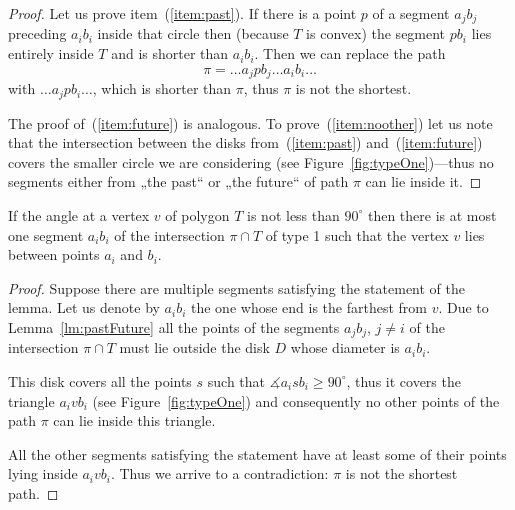 \documentclass[a4paper,11pt]{article}
\begin{document}
\begin{proof}

	Let us prove item~(\ref{item:past}). If there is a point $p$ of a segment $a_jb_j$ preceding $a_ib_i$ inside that circle then (because $T$ is convex) the segment $pb_i$ lies entirely inside $T$ and is shorter than $a_ib_i$. Then we can replace the path
	$$\pi = \ldots a_jpb_j \ldots a_ib_i \ldots$$
with $\ldots a_jpb_i \ldots$, which is shorter than $\pi$, thus $\pi$ is not the shortest.

	The proof of~(\ref{item:future}) is analogous. To prove~(\ref{item:noother}) let us note that the intersection between the disks from~(\ref{item:past}) and~(\ref{item:future}) covers the smaller circle we are considering (see Figure~\ref{fig:typeOne})—thus no segments either from „the past“ or „the future“ of path $\pi$ can lie inside it.

\end{proof}

\begin{figure}[h]
	
\end{figure}

\begin{lemma}
\label{lm:typeOne}
	If the angle at a vertex $v$ of polygon $T$ is not less than $90^\circ$ then there is at most one segment $a_ib_i$ of the intersection $\pi \cap T$ of type 1 such that the vertex $v$ lies between points $a_i$ and $b_i$.
\end{lemma}

\begin{proof}

	Suppose there are multiple segments satisfying the statement of the lemma. Let us denote by $a_ib_i$ the one whose end is the farthest from $v$. Due to Lemma~\ref{lm:pastFuture} all the points of the segments $a_jb_j$, $j \ne i$ of the intersection $\pi \cap T$ must lie outside the disk $D$ whose diameter is $a_ib_i$.
	
	This disk covers all the points $s$ such that $\measuredangle a_isb_i \ge 90^\circ$, thus it covers the triangle $a_ivb_i$ (see Figure~\ref{fig:typeOne}) and consequently no other points of the path $\pi$ can lie inside this triangle.

	All the other segments satisfying the statement have at least some of their points lying inside $a_ivb_i$. Thus we arrive to a contradiction: $\pi$ is not the shortest path.

\end{proof}
\end{document}
